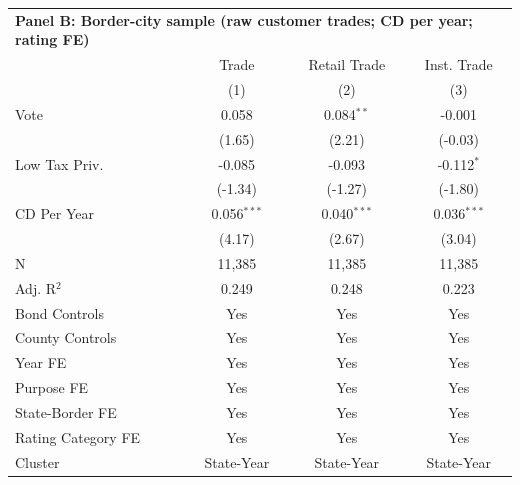 \begingroup
\centering
\begin{tabular*}{\textwidth}{@{\extracolsep{\fill}}lccc}
\multicolumn{5}{l}{\textbf{Panel B: Border-city sample (raw customer trades; CD per year; rating FE)}}\\

\addlinespace
   \toprule
                      & Trade         & Retail Trade  & Inst. Trade\\  
                      & (1)           & (2)           & (3)\\  
   \midrule 
   Vote               & 0.058         & 0.084$^{**}$  & -0.001\\   
                      & (1.65)       & (2.21)       & (-0.03)\\   
   Low Tax Priv.      & -0.085        & -0.093        & -0.112$^{*}$\\   
                      & (-1.34)      & (-1.27)      & (-1.80)\\   
   CD Per Year        & 0.056$^{***}$ & 0.040$^{***}$ & 0.036$^{***}$\\   
                      & (4.17)       & (2.67)       & (3.04)\\   
   \hline
   N       & 11,385        & 11,385        & 11,385\\  
   Adj. R$^2$     & 0.249         & 0.248         & 0.223\\  
   Bond Controls      & Yes           & Yes           & Yes\\  
   County Controls    & Yes           & Yes           & Yes\\  
   Year FE            & Yes           & Yes           & Yes\\  
   Purpose FE         & Yes           & Yes           & Yes\\  
   State-Border FE    & Yes           & Yes           & Yes\\  
   Rating Category FE & Yes           & Yes           & Yes\\  
   Cluster              & State-Year & State-Year & State-Year\\  
   \bottomrule
\end{tabular*}
\par\endgroup
